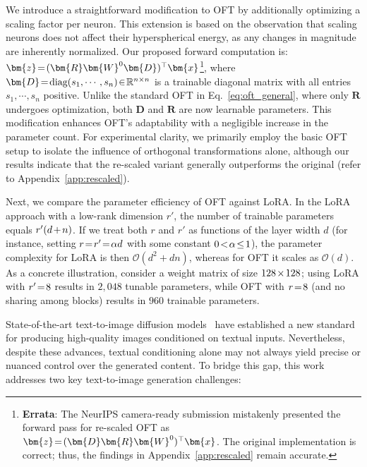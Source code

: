 We introduce a straightforward modification to OFT by additionally optimizing a scaling factor per neuron. This extension is based on the observation that scaling neurons does not affect their hyperspherical energy, as any changes in magnitude are inherently normalized. Our proposed forward computation is: $\thickmuskip=2mu \medmuskip=2mu\bm{z}=(\bm{R}\bm{W}^0\bm{D})^\top\bm{x}$\footnote{\textbf{Errata}: The NeurIPS camera-ready submission mistakenly presented the forward pass for re-scaled OFT as $\thickmuskip=2mu \medmuskip=2mu\bm{z}=(\bm{D}\bm{R}\bm{W}^0)^\top\bm{x}$. The original implementation is correct; thus, the findings in Appendix~\ref{app:rescaled} remain accurate.}, where $\thickmuskip=2mu \medmuskip=2mu\bm{D} = \text{diag}(s_1, \cdots, s_n) \in \mathbb{R}^{n \times n}$ is a trainable diagonal matrix with all entries $s_1,\cdots,s_n$ positive. Unlike the standard OFT in Eq.~\eqref{eq:oft_general}, where only $\bm{R}$ undergoes optimization, both $\bm{D}$ and $\bm{R}$ are now learnable parameters. This modification enhances OFT’s adaptability with a negligible increase in the parameter count. For experimental clarity, we primarily employ the basic OFT setup to isolate the influence of orthogonal transformations alone, although our results indicate that the re-scaled variant generally outperforms the original (refer to Appendix~\ref{app:rescaled}).

Next, we compare the parameter efficiency of OFT against LoRA. In the LoRA approach with a low-rank dimension $r'$, the number of trainable parameters equals $\thickmuskip=2mu \medmuskip=2mu r'(d+n)$. If we treat both $r$ and $r'$ as functions of the layer width $d$ (for instance, setting $\thickmuskip=2mu \medmuskip=2mu r = r' = \alpha d$ with some constant $\thickmuskip=2mu \medmuskip=2mu 0 < \alpha \leq 1$), the parameter complexity for LoRA is then $\mathcal{O}(d^2 + dn)$, whereas for OFT it scales as $\mathcal{O}(d)$. As a concrete illustration, consider a weight matrix of size $\thickmuskip=2mu \medmuskip=2mu 128 \times 128$; using LoRA with $\thickmuskip=2mu \medmuskip=2mu r' = 8$ results in $2,048$ tunable parameters, while OFT with $\thickmuskip=2mu \medmuskip=2mu r = 8$ (and no sharing among blocks) results in $960$ trainable parameters.

State-of-the-art text-to-image diffusion models~\cite{saharia2022photorealistic,ramesh2022hierarchical,rombach2022high} have established a new standard for producing high-quality images conditioned on textual inputs. Nevertheless, despite these advances, textual conditioning alone may not always yield precise or nuanced control over the generated content. To bridge this gap, this work addresses two key text-to-image generation challenges:

